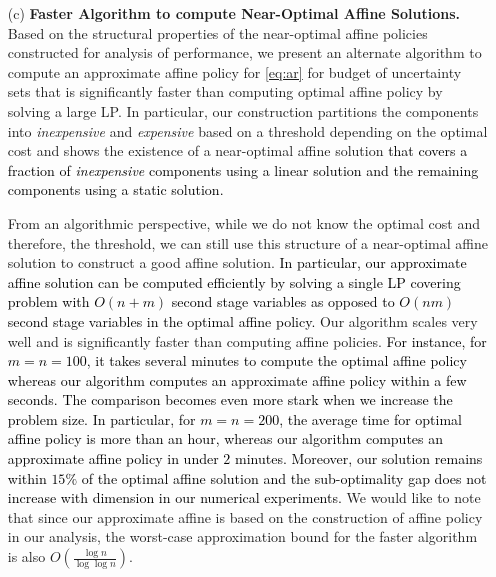 \documentclass[moor]{informs1}              %
\newcommand{\mb}[1]{\ensuremath{\boldsymbol{#1}}}
\newcommand*{\red}{\textcolor{black}}
\begin{document}
\begin{enumerate}
 \vspace{2mm}
\item [(c)] {\bf Faster Algorithm to compute Near-Optimal Affine Solutions.} 
Based on the structural properties of the near-optimal affine policies constructed for analysis of performance,  we present an alternate algorithm to compute an approximate affine policy for \eqref{eq:ar} for budget of uncertainty sets that is significantly faster than computing optimal affine policy by solving a large LP. In particular, our construction partitions the components into {\em inexpensive} and {\em expensive} based on a threshold depending on the optimal cost and 
shows the existence of a near-optimal affine solution \red{ that covers a fraction of {\em inexpensive} components using a linear solution and the remaining components using a static solution. }

From an algorithmic perspective, while we do not know the optimal cost and therefore, the threshold, we can still use this structure of a near-optimal affine solution to construct a good affine solution. \red{ In particular, our approximate affine solution can be computed efficiently by solving a single LP covering problem with $O(n+m)$ second stage variables as opposed to $O(nm)$ second stage variables in the optimal affine policy. }
Our algorithm scales very well and is significantly faster than computing affine policies. \red{ For instance, for $m=n=100$, it takes several minutes to compute the optimal affine policy whereas our algorithm computes an approximate affine policy within a few seconds. The comparison becomes even more stark when we increase the problem size. In particular, for $m=n=200$, the average time for optimal affine policy is more than an hour, whereas our algorithm computes an approximate affine policy in under $2$ minutes.   Moreover, our solution remains within $15\%$ of the optimal affine solution and the sub-optimality gap does not increase with dimension in our numerical experiments.} We would like to note that since our approximate affine is based on the construction of affine policy in our analysis, the worst-case approximation bound for the faster algorithm is also $O (  \frac{\log n}{\log \log n} )$.


\end{enumerate}
\end{document}
